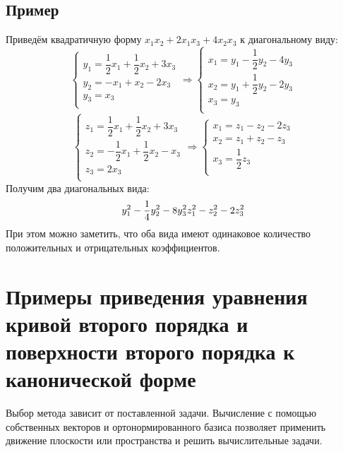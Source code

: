\documentclass[12pt]{article}
\begin{document}
    \subsection{Пример}
    Приведём квадратичную форму $x_1x_2 + 2x_1x_3 + 4x_2x_3$ к диагональному виду:
    \[
        \begin{cases}
            y_1 = \dfrac{1}{2}x_1 + \dfrac{1}{2}x_2 + 3x_3 \\
            y_2 = -x_1 + x_2 - 2x_3                        \\
            y_3 = x_3                                      \\
        \end{cases} \Rightarrow
        \begin{cases}
            x_1 = y_1 - \dfrac{1}{2}y_2 - 4y_3 \\
            x_2 = y_1 + \dfrac{1}{2}y_2 - 2y_3 \\
            x_3 = y_3                          \\
        \end{cases}
    \]
    \[
        \begin{cases}
            z_1 = \dfrac{1}{2}x_1 + \dfrac{1}{2}x_2 + 3x_3 \\
            z_2 = -\dfrac{1}{2}x_1 + \dfrac{1}{2}x_2 - x_3 \\
            z_3 = 2x_3                                     \\
        \end{cases} \Rightarrow
        \begin{cases}
            x_1 = z_1 - z_2 - 2z_3 \\
            x_2 = z_1 + z_2 - z_3  \\
            x_3 = \dfrac{1}{2}z_3  \\
        \end{cases}
    \]
    Получим два диагональных вида:
    \[
        y_1^2 - \dfrac{1}{4}y_2^2 - 8y_3^2 \\ z_1^2 - z_2^2 - 2z_3^2
    \]
    При этом можно заметить, что оба вида имеют одинаковое количество положительных и отрицательных коэффициентов.

    \section{Примеры приведения уравнения кривой второго порядка и поверхности второго порядка к канонической форме}
    Выбор метода зависит от поставленной задачи. Вычисление с помощью собственных векторов и ортонормированного базиса позволяет применить движение плоскости или пространства и решить вычислительные задачи.
\end{document}
